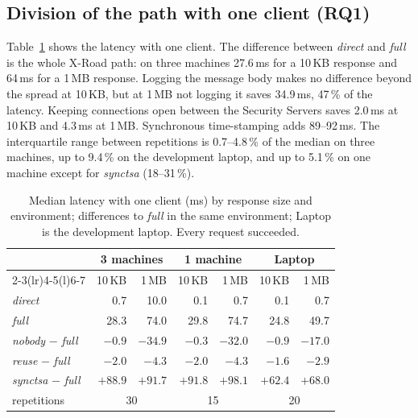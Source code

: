 \documentclass[conference,a4paper]{IEEEtran}
\newcommand{\newtext}[1]{{\color{blue}#1}}
\begin{document}
\subsection{\newtext{Division of the path with one client (RQ1)}}\label{sec:rq1}

Table~\ref{tab:onecl} shows the latency with one client. The difference between \emph{direct} and
\emph{full} is the whole X-Road path: on three machines 27.6\,ms for a 10\,KB response and 64\,ms for
a 1\,MB response. Logging the message body makes no difference beyond the spread at 10\,KB, but at
1\,MB not logging it saves 34.9\,ms, 47\,\% of the latency. Keeping connections open between the
Security Servers saves 2.0\,ms at 10\,KB and 4.3\,ms at 1\,MB. Synchronous time-stamping adds
89--92\,ms. The interquartile range between repetitions is 0.7--4.8\,\% of the median on three machines, up
to 9.4\,\% on the development laptop, and up to 5.1\,\% on one machine except for \emph{synctsa}
(18--31\,\%).

\begin{table}[!htb]
\centering\footnotesize
\setlength{\tabcolsep}{3.5pt}
\caption{Median latency with one client (ms) by response size and environment; differences to
\emph{full} in the same environment; Laptop is the development laptop. Every request succeeded.}
\label{tab:onecl}
\begin{tabular}{@{}lrrrrrr@{}}
\toprule
& \multicolumn{2}{c}{3 machines} & \multicolumn{2}{c}{1 machine} & \multicolumn{2}{c}{Laptop} \\
\cmidrule(lr){2-3}\cmidrule(lr){4-5}\cmidrule(l){6-7}
& 10\,KB & 1\,MB & 10\,KB & 1\,MB & 10\,KB & 1\,MB \\
\midrule
\emph{direct} & 0.7 & 10.0 & 0.1 & 0.7 & 0.1 & 0.7 \\
\emph{full} & 28.3 & 74.0 & 29.8 & 74.7 & 24.8 & 49.7 \\
\emph{nobody} $-$ \emph{full} & $-0.9$ & $-34.9$ & $-0.3$ & $-32.0$ & $-0.9$ & $-17.0$ \\
\emph{reuse} $-$ \emph{full} & $-2.0$ & $-4.3$ & $-2.0$ & $-4.3$ & $-1.6$ & $-2.9$ \\
\emph{synctsa} $-$ \emph{full} & $+88.9$ & $+91.7$ & $+91.8$ & $+98.1$ & $+62.4$ & $+68.0$ \\
\midrule
repetitions & \multicolumn{2}{c}{30} & \multicolumn{2}{c}{15} & \multicolumn{2}{c}{20} \\
\bottomrule
\end{tabular}
\end{table}
\end{document}
